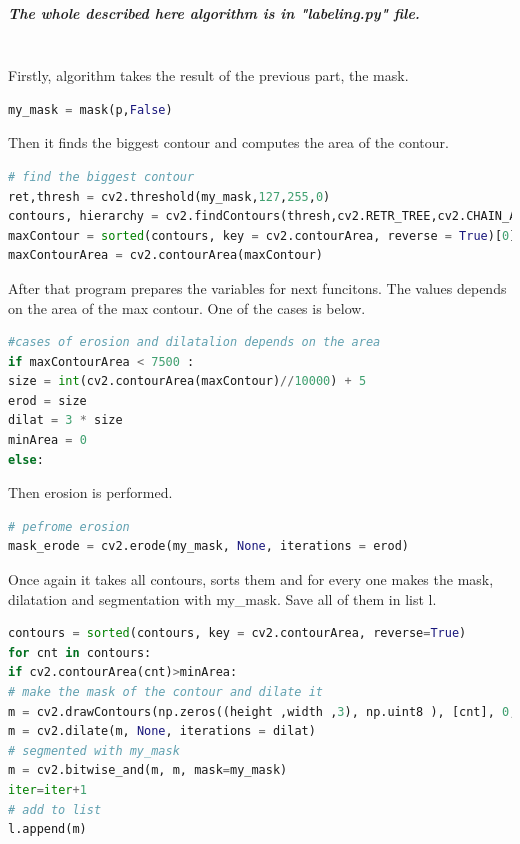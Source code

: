 \documentclass[12pt]{article}
\begin{document}
\subparagraph{
The whole described here algorithm is in "labeling.py" file. \\\\
}

Firstly, algorithm takes the result of the previous part, the mask.

\begin{lstlisting}[language=Python]
my_mask = mask(p,False)
\end{lstlisting}

Then it finds the biggest contour and computes the area of the contour.

\begin{lstlisting}[language=Python]
# find the biggest contour
ret,thresh = cv2.threshold(my_mask,127,255,0)
contours, hierarchy = cv2.findContours(thresh,cv2.RETR_TREE,cv2.CHAIN_APPROX_SIMPLE)
maxContour = sorted(contours, key = cv2.contourArea, reverse = True)[0]
maxContourArea = cv2.contourArea(maxContour)
\end{lstlisting}

After that program prepares the variables for next funcitons. The values depends on the area of the max contour.
One of the cases is below.

\begin{lstlisting}[language=Python]
#cases of erosion and dilatalion depends on the area
if maxContourArea < 7500 :
size = int(cv2.contourArea(maxContour)//10000) + 5
erod = size
dilat = 3 * size
minArea = 0
else:
\end{lstlisting}

Then erosion is performed.

\begin{lstlisting}[language=Python]
# pefrome erosion
mask_erode = cv2.erode(my_mask, None, iterations = erod)
\end{lstlisting}

Once again it takes all contours, sorts them and for every one makes the mask, dilatation and segmentation with my\_mask.
Save all of them in list l.

\begin{lstlisting}[language=Python]
contours = sorted(contours, key = cv2.contourArea, reverse=True)
for cnt in contours:
if cv2.contourArea(cnt)>minArea:
# make the mask of the contour and dilate it
m = cv2.drawContours(np.zeros((height ,width ,3), np.uint8 ), [cnt], 0, colors[iter%(len(colors)+1)], cv2.FILLED)
m = cv2.dilate(m, None, iterations = dilat)
# segmented with my_mask
m = cv2.bitwise_and(m, m, mask=my_mask)
iter=iter+1
# add to list
l.append(m)
\end{lstlisting}
\end{document}
